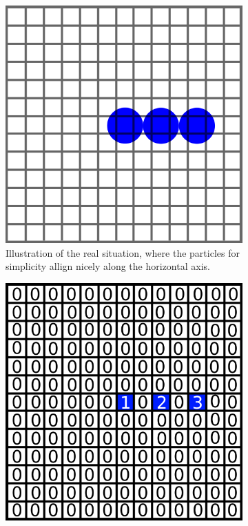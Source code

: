 \begin{figure}[h]
	\begin{center}
		\begin{subfigure}[t]{0.3\textwidth}
			\includegraphics[width = \textwidth]{fig/A_sketch.png}
			\caption{Illustration of the real situation, where the particles for simplicity allign nicely along the horizontal axis.  }
			\label{fig:A_sketch}
		\end{subfigure}
		\begin{subfigure}[t]{0.3\textwidth}
			\includegraphics[width = \textwidth]{fig/B_array.png}

\end{subfigure}
\end{center}
\end{figure}
